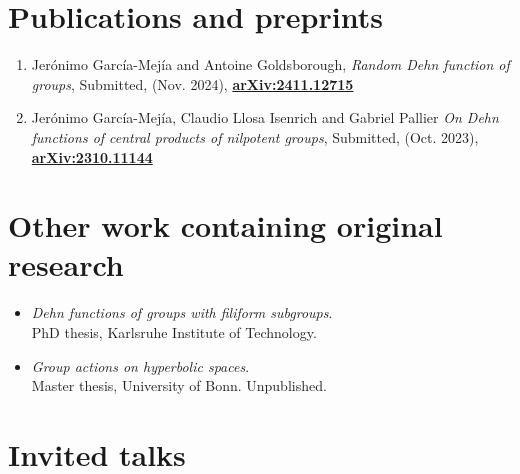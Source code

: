 \documentclass[a4paper,11pt]{article} %
\begin{document}

\section{Publications and preprints}

\begin{minipage}{15cm}
\begin{enumerate}[align=right, leftmargin=1.8em]
    \item Jerónimo García-Mejía and Antoine Goldsborough, \emph{Random Dehn function of groups},  Submitted, (Nov. 2024), {\href{https://arxiv.org/abs/2411.12715}{\textbf{arXiv:2411.12715}}}
    
    \item Jerónimo García-Mejía, Claudio Llosa Isenrich and Gabriel Pallier \emph{On Dehn functions of central products of nilpotent groups}, Submitted,  (Oct. 2023), {\href{https://arxiv.org/abs/2310.11144}{\textbf{arXiv:2310.11144}}}
\end{enumerate}
\end{minipage}


\section{Other work containing original research}

\begin{itemize}
    \item \emph{Dehn functions of groups with filiform subgroups}. \\
    PhD thesis, Karlsruhe Institute of Technology. 

    \item \emph{Group actions on hyperbolic spaces}. \\
    Master thesis, University of Bonn. Unpublished. 
\end{itemize}


\section{Invited talks}
\end{document}
